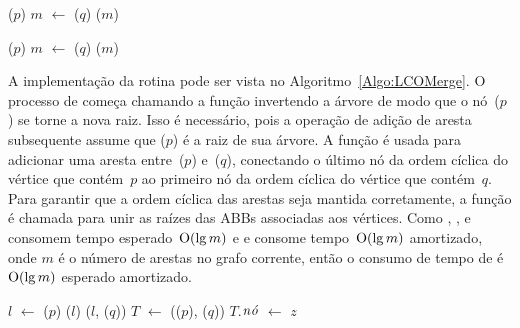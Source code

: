 \begin{minipage}{0.4\textwidth}
\begin{algorithm}[H]
\caption{\LCOMax($p$, $q$)}
\label{Algo:LCOMax}
\begin{algorithmic}[1]
\State \linkcutEvert($p$)
\State $m$ $\gets$ \linkcutMax($q$)
\State \Return \LCOFindNode($m$)
\end{algorithmic}
\end{algorithm}
\end{minipage}
\hfill
\begin{minipage}{0.4\textwidth}
\begin{algorithm}[H]
\caption{\LCOMin($p$, $q$)}
\label{Algo:LCOMin}
\begin{algorithmic}[1]
\State \linkcutEvert($p$)
\State $m$ $\gets$ \linkcutMin($q$)
\State \Return \LCOFindNode($m$)
\end{algorithmic}
\end{algorithm}
\end{minipage}



A implementação da rotina \LCOMerge{} pode ser vista no Algoritmo~\ref{Algo:LCOMerge}.
O processo de \LCOMerge{} começa chamando a função \linkcutEvert{} invertendo a árvore de modo que o nó~\treapLast($p$) se torne a nova raiz.
Isso é necessário, pois a operação \linkcutAddEdge{} de adição de aresta subsequente assume que \treapLast($p$) é a raiz de sua árvore.
A função \linkcutAddEdge{} é usada para adicionar uma aresta entre~\treapLast($p$) e~\treapFirst($q$), conectando o último nó da ordem cíclica do vértice que contém~$p$ ao primeiro nó da ordem cíclica do vértice que contém~$q$.
Para garantir que a ordem cíclica das arestas seja mantida corretamente, a função \treapJoin{} é chamada para unir as raízes das ABBs associadas aos vértices.
Como \treapFirst{}, \treapLast{}, \treapGetRoot{} e \treapJoin{} consomem tempo esperado~$\mathrm{O}(\lg m)$ e \linkcutEvert{} e \linkcutAddEdge{} consome tempo~$\mathrm{O}(\lg m)$ amortizado, onde $m$ é o número de arestas no grafo corrente, então o consumo de tempo de \LCOMerge{} é~$\mathrm{O}(\lg m)$ esperado amortizado.


\begin{algorithm}[htb]
\caption{\LCOMerge($p$, $q$, $z$)}
\label{Algo:LCOMerge}
\begin{algorithmic}[1]
\State $l$ $\gets$ \treapLast($p$)
\State \linkcutEvert($l$)
\State \linkcutAddEdge($l$, \treapFirst($q$))
\State $T$ $\gets$ \treapJoin(\treapGetRoot($p$), \treapGetRoot($q$))
\State $T$.$\mathit{n\acute{o}}$ $\gets$ $z$
\end{algorithmic}
\end{algorithm}


